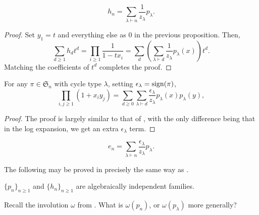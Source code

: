 	\begin{corollary}
		\[ h_n = \sum_{\lambda \vdash n} \frac{1}{z_\lambda} p_\lambda. \]
	\end{corollary}
	\begin{proof}
		Set $y_1 = t$ and everything else as $0$ in the previous proposition. Then,
		\[ \sum_{d \ge 1} h_d t^d = \prod_{i \ge 1} \frac{1}{1-tx_i} = \sum_d \left(\sum_{\lambda \vdash d} \frac{1}{z_\lambda} p_\lambda(x)\right) t^d. \]
		Matching the coefficients of $t^d$ completes the proof.
	\end{proof}

	\begin{prop}
		For any $\pi \in \mathfrak{S}_n$ with cycle type $\lambda$, setting $\epsilon_\lambda = \operatorname{sign}(\pi)$,
		\[ \prod_{i,j \ge 1} (1+x_iy_j) = \sum_{d \ge 0} \sum_{\lambda \vdash d} \frac{\epsilon_\lambda}{z_\lambda} p_\lambda(x) p_\lambda(y), \]
	\end{prop}
	\begin{proof}
		The proof is largely similar to that of , with the only difference being that in the log expansion, we get an extra $\epsilon_\lambda$ term.
	\end{proof}

	\begin{corollary}
		\[ e_n = \sum_{\lambda \vdash n} \frac{\epsilon_\lambda}{z_\lambda} p_\lambda. \]
	\end{corollary}

	The following may be proved in precisely the same way as .
	\begin{fpor}
		$\{p_n\}_{n \ge 1}$ and $\{h_n\}_{n \ge 1}$ are algebraically independent families.
	\end{fpor}

	Recall the involution $\omega$ from . What is $\omega(p_n)$, or $\omega(p_\lambda)$ more generally?

